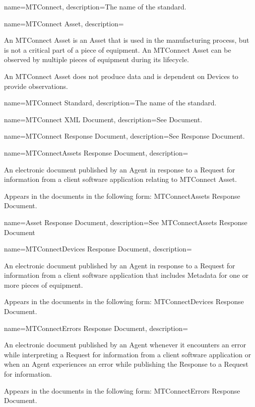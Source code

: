 {
    name={MTConnect},
	description={The name of the standard.}
}

{
    name={MTConnect Asset},
	description={An \gls{MTConnect Asset} is an \gls{Asset} that is used in the manufacturing process, but is not a critical part of a piece of equipment. An \gls{MTConnect Asset} can be observed by multiple pieces of equipment during its lifecycle.

An \gls{MTConnect Asset} does not produce data and is dependent on \gls{Devices} to provide observations.

}
}

{
    name={MTConnect Standard},
	description={The name of the standard.}
}

{
    name={MTConnect XML Document},
	description={See \gls{Document}.}
}

{
    name={MTConnect Response Document},
	description={See \gls{Response Document}.}
}

{
    name={MTConnectAssets Response Document},
	description={
	An electronic document published by an \gls{Agent} in response to a \gls{Request} for information from a client software application relating to \gls{MTConnect Asset}.

	Appears in the documents in the following form: \gls{MTConnectAssets Response Document}.
}
}

{
    name={Asset Response Document},
	description={See \gls{MTConnectAssets Response Document}}
}

{
    name={MTConnectDevices Response Document},
	description={
	An electronic document published by an \gls{Agent} in response to a \gls{Request} for information from a client software application that includes \gls{Metadata} for one or more pieces of equipment.

	Appears in the documents in the following form: \gls{MTConnectDevices Response Document}.
}
}

{
    name={MTConnectErrors Response Document},
	description={
	An electronic document published by an \gls{Agent} whenever it encounters an error while interpreting a \gls{Request} for information from a client software application or when an \gls{Agent} experiences an error while publishing the \gls{Response} to a \gls{Request} for information.

	Appears in the documents in the following form: \gls{MTConnectErrors Response Document}.
}
}

